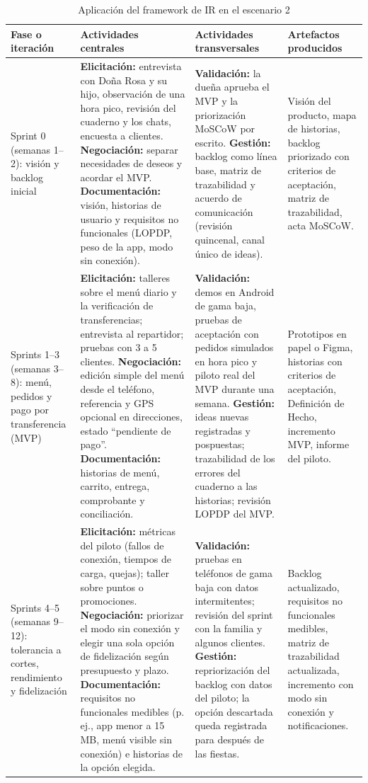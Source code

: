 \documentclass[12pt,a4paper]{article}
\begin{document}
\begin{table}[H]
\centering
\caption{Aplicación del framework de IR en el escenario 2}
\scriptsize
\begin{tabularx}{\textwidth}{
    >{\raggedright\arraybackslash}p{2.1cm} Y Y Y
}
\toprule
\textbf{Fase o iteración} &
\textbf{Actividades centrales} &
\textbf{Actividades transversales} &
\textbf{Artefactos producidos} \\
\midrule
Sprint 0 (semanas 1--2): visión y backlog inicial & \textbf{Elicitación:} entrevista con Doña Rosa y su hijo, observación de una hora pico, revisión del cuaderno y los chats, encuesta a clientes. \textbf{Negociación:} separar necesidades de deseos y acordar el MVP. \textbf{Documentación:} visión, historias de usuario y requisitos no funcionales (LOPDP, peso de la app, modo sin conexión). & \textbf{Validación:} la dueña aprueba el MVP y la priorización MoSCoW por escrito. \textbf{Gestión:} backlog como línea base, matriz de trazabilidad y acuerdo de comunicación (revisión quincenal, canal único de ideas). & Visión del producto, mapa de historias, backlog priorizado con criterios de aceptación, matriz de trazabilidad, acta MoSCoW. \\
\midrule
Sprints 1--3 (semanas 3--8): menú, pedidos y pago por transferencia (MVP) & \textbf{Elicitación:} talleres sobre el menú diario y la verificación de transferencias; entrevista al repartidor; pruebas con 3 a 5 clientes. \textbf{Negociación:} edición simple del menú desde el teléfono, referencia y GPS opcional en direcciones, estado ``pendiente de pago''. \textbf{Documentación:} historias de menú, carrito, entrega, comprobante y conciliación. & \textbf{Validación:} demos en Android de gama baja, pruebas de aceptación con pedidos simulados en hora pico y piloto real del MVP durante una semana. \textbf{Gestión:} ideas nuevas registradas y pospuestas; trazabilidad de los errores del cuaderno a las historias; revisión LOPDP del MVP. & Prototipos en papel o Figma, historias con criterios de aceptación, Definición de Hecho, incremento MVP, informe del piloto. \\
\midrule
Sprints 4--5 (semanas 9--12): tolerancia a cortes, rendimiento y fidelización & \textbf{Elicitación:} métricas del piloto (fallos de conexión, tiempos de carga, quejas); taller sobre puntos o promociones. \textbf{Negociación:} priorizar el modo sin conexión y elegir una sola opción de fidelización según presupuesto y plazo. \textbf{Documentación:} requisitos no funcionales medibles (p. ej., app menor a 15 MB, menú visible sin conexión) e historias de la opción elegida. & \textbf{Validación:} pruebas en teléfonos de gama baja con datos intermitentes; revisión del sprint con la familia y algunos clientes. \textbf{Gestión:} repriorización del backlog con datos del piloto; la opción descartada queda registrada para después de las fiestas. & Backlog actualizado, requisitos no funcionales medibles, matriz de trazabilidad actualizada, incremento con modo sin conexión y notificaciones. \\

\end{tabularx}
\end{table}
\end{document}
